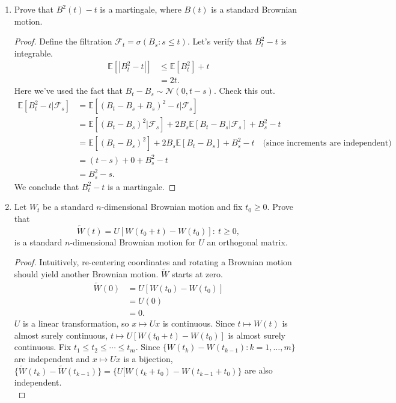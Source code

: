 \documentclass[11pt,letterpaper]{report}
\newcommand{\mcal}[1]{\mathcal{#1}}
\newcommand{\E}{\mathbb{E}}
\begin{document}
\begin{enumerate}
	\item Prove that $B^2(t) - t$ is a martingale, where $B(t)$ is a standard Brownian motion.
	\begin{proof}
		Define the filtration $\mcal{F}_t = \sigma(B_s: s\leq t)$. Let's verify that $B_t^2 -t$ is integrable.
		\begin{align*}
		 	\E[|B_t^2 - t|] &\leq \E[B_t^2] + t\\
		 	&= 2t.
		\end{align*} 
		Here we've used the fact that $B_t - B_s \sim \mcal{N}(0, t-s)$. Check this out.
		\begin{align*}
			\E[B_t^2 - t| \mcal{F}_s] &= \E[(B_t - B_s + B_s)^2 - t| \mcal{F}_s]\\
			&= \E[(B_t-B_s)^2|\mcal{F}_s] + 2B_s\E[B_t-B_s|\mcal{F}_s] + B_s^2 - t\\
			&= \E[(B_t-B_s)^2] + 2B_s\E[B_t-B_s] + B_s^2 - t\quad\text{(since increments are independent)}\\
			&= (t-s) + 0 + B_s^2 - t\\
			&= B_s^2 - s.
		\end{align*}
		We conclude that $B_t^2 - t$ is a martingale.
	\end{proof}

	\item Let $W_t$ be a standard $n$-dimensional Brownian motion and fix $t_0\geq 0$. Prove that
	\[
	\tilde{W}(t) = U[W(t_0+t) - W(t_0)]:\ t\geq 0,
	\]
	is a standard $n$-dimensional Brownian motion for $U$ an orthogonal matrix.
	\begin{proof}
		Intuitively, re-centering coordinates and rotating a Brownian motion should yield another Brownian motion. $\tilde{W}$ starts at zero.
		\begin{align*}
			\tilde{W}(0) &= U[W(t_0) - W(t_0)]\\
			&= U(0)\\
			&= 0.
		\end{align*}
		$U$ is a linear transformation, so $x\mapsto Ux$ is continuous. Since $t\mapsto W(t)$ is almost surely continuous, $t\mapsto U[W(t_0+t) - W(t_0)]$ is almost surely continuous. Fix $t_1\leq t_2 \leq \cdots \leq t_m$. Since $\{W(t_k) - W(t_{k-1}): k = 1, \ldots, m\}$ are independent and $x\mapsto Ux$ is a bijection, $\{\tilde{W}(t_k) - \tilde{W}(t_{k-1})\} = \{U[W(t_k+t_0) - W(t_{k-1}+t_0)\}$ are also independent.\\


\end{proof}
\end{enumerate}
\end{document}
